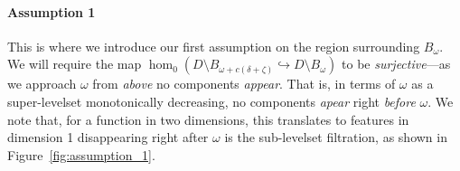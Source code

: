 \paragraph{Assumption 1}

This is where we introduce our first assumption on the region surrounding $B_\omega$.
We will require the map $\hom_0(D\setminus B_{\omega+c(\delta+\zeta)}\hookrightarrow D\setminus B_\omega)$ to be \emph{surjective}---as we approach $\omega$ from \emph{above} no components \emph{appear}.
That is, in terms of $\omega$ as a super-levelset monotonically decreasing, no components \emph{apear} right \emph{before} $\omega$.
We note that, for a function in two dimensions, this translates to features in dimension 1 disappearing right after $\omega$ is the sub-levelset filtration, as shown in Figure~\ref{fig:assumption_1}.

